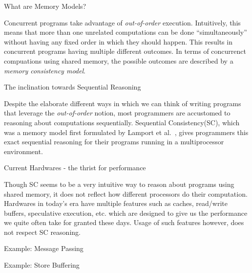 \documentclass[notes, xcolor = dvipsnames]{beamer}
\begin{document}
    \begin{frame}{What are Memory Models?}
    
        Concurrent programs take advantage of \textit{out-of-order} execution. 
        Intuitively, this means that more than one unrelated computations can be done ``simultaneously'' without having any fixed order in which they should happen.
        This results in concurrent programs having multiple different outcomes.
        In terms of concurrenct compuations using shared memory, the possible outcomes are described by
        a \textit{memory consistency model}.
    
    \end{frame}

    \begin{frame}{The inclination towards Sequential Reasoning}

        Despite the elaborate different ways in which we can think of writing programs that leverage the \textit{out-of-order} notion, most programmers are accustomed to reasoning about computations sequentially. 
        Sequential Consistency(SC), which was a memory model first formulated by Lamport et al.~\cite{Lamport79}, gives programmers this exact sequential reasoning for their programs running in a multiprocessor environment.
        
    \end{frame}

    \begin{frame}{Current Hardwares - the thrist for performance}

        Though SC seems to be a very intuitive way to reason about programs using shared memory, it does not reflect how different processors do their computation.
        Hardwares in today's era have multiple features such as caches, read/write buffers, speculative execution, etc. which are designed to give us the performance we quite often take for granted these days.
        Usage of such features however, does not respect SC reasoning.
        
    \end{frame}

    \begin{frame}{Example: Message Passing}
        
    \end{frame}

    \begin{frame}{Example: Store Buffering}
        
    \end{frame}
\end{document}
